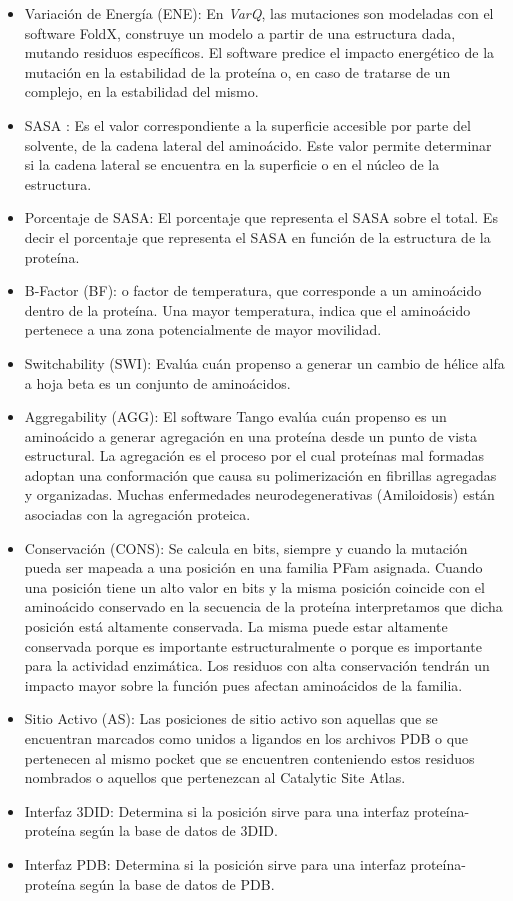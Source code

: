 \begin{itemize}
    \item Variación de Energía (ENE): En \textit{VarQ}, las mutaciones son modeladas con el software FoldX, construye un modelo a partir de una estructura dada, mutando residuos específicos. El software predice el impacto energético de la mutación en la estabilidad de la proteína o, en caso de tratarse de un complejo, en la estabilidad del mismo.
     \item SASA : Es el valor correspondiente a la superficie accesible por parte del solvente, de la cadena lateral del aminoácido. Este valor permite determinar si la cadena lateral se encuentra en la superficie o en el núcleo de la estructura.
     \item Porcentaje de SASA: El porcentaje que representa el SASA sobre el total. Es decir el porcentaje que representa el SASA en función de la estructura de la proteína.
     \item B-Factor (BF): o factor de temperatura, que corresponde a un aminoácido dentro de la proteína. Una mayor temperatura, indica que el aminoácido pertenece a una zona potencialmente de mayor movilidad.
     \item Switchability (SWI): Evalúa cuán propenso a generar un cambio de hélice alfa a hoja beta es un conjunto de aminoácidos.
     \item Aggregability (AGG): El software Tango evalúa cuán
    propenso es un aminoácido a generar agregación en una proteína desde un punto de vista estructural. La agregación es el proceso por el cual proteínas mal formadas
    adoptan una conformación que causa su polimerización en fibrillas agregadas y organizadas. Muchas enfermedades neurodegenerativas (Amiloidosis) están asociadas con la agregación proteica.
     \item Conservación (CONS): Se calcula en bits, siempre y cuando la mutación pueda ser mapeada a una posición en una familia PFam asignada. Cuando una posición tiene un alto valor en bits y la
    misma posición coincide con el aminoácido conservado en la secuencia de la proteína
    interpretamos que dicha posición está altamente conservada. La misma puede estar
    altamente conservada porque es importante estructuralmente o porque es importante para
    la actividad enzimática. Los residuos con alta conservación tendrán un impacto mayor sobre la función pues afectan aminoácidos de la familia.
     \item Sitio Activo (AS): Las posiciones de sitio activo son
    aquellas que se encuentran marcados como unidos a ligandos en los archivos PDB o que
    pertenecen al mismo pocket que se encuentren conteniendo estos residuos nombrados o
    aquellos que pertenezcan al Catalytic Site Atlas.
     \item Interfaz 3DID: Determina si la posición sirve para una interfaz proteína-proteína según la base de datos de 3DID.
     \item Interfaz PDB: Determina si la posición sirve para una interfaz proteína-proteína según la base de datos de PDB.
\end{itemize}


